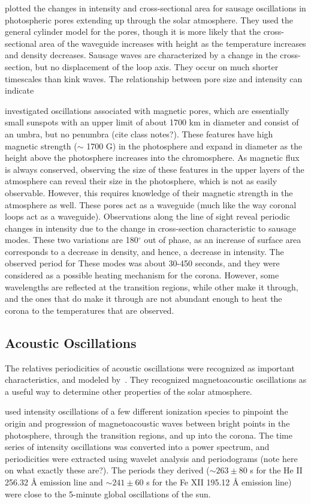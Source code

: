\documentclass[preprint2]{aastex}
\begin{document}
\cite{sausage_1} plotted the changes in intensity and cross-sectional
area for sausage oscillations in photospheric pores extending up
through the solar atmosphere. They used the general cylinder model for
the pores, though it is more likely that the cross-sectional area of
the waveguide increases with height as the temperature increases and
density decreases.
Sausage waves are characterized by a change in the cross-section,
but no displacement of the loop axis. They occur on much shorter
timescales than kink waves.
The relationship between pore size and intensity can
indicate

\cite{sausage_2} investigated oscillations associated with magnetic
pores, which are essentially small sunspots with an upper limit of
about 1700 km in diameter and consist of an umbra, but no penumbra
(cite class notes?). These features have high magnetic strength
($\sim$ 1700 G) in the photosphere and expand in diameter as the
height above the
photosphere increases into the chromosphere. As magnetic flux is
always conserved, observing the size of these features in the upper
layers of the atmosphere can reveal their size in the photosphere,
which is not as easily observable. However, this requires knowledge
of their magnetic strength in the atmosphere as well.
These pores act as a waveguide (much like the way coronal loops act
as a waveguide). Observations along the line of sight reveal periodic
changes in intensity due to the change in cross-section characteristic
to sausage modes. These two variations are 180$^{\circ}$ out of phase,
as an increase of surface area corresponds to a decrease in density,
and hence, a decrease in intensity. The observed period for These modes
was about 30-450 seconds, and they were considered as a
possible heating mechanism for the corona. However, some wavelengths are
reflected at the transition regions, while other make it through,
and the ones that do make it through are not abundant enough to heat
the corona to the temperatures that are observed.

\subsection{Acoustic Oscillations}
The relatives periodicities of acoustic oscillations were recognized
as important characteristics, and modeled by~\cite{acoustic_1}.
They recognized magnetoacoustic oscillations as a useful way to determine
other properties of the solar atmosphere.

\cite{acoustic_2} used intensity oscillations of a few different ionization
species to pinpoint the origin and progression of magnetoacoustic waves
between bright points in the photosphere, through the transition regions,
and up into the corona. The time series of intensity oscillations was
converted into a power spectrum, and periodicities were extracted using
wavelet analysis and periodograms (note here on what exactly these are?).
The periods they derived
($\sim 263 \pm 80$ s for the He II 256.32 \AA{} emission line and
$\sim 241 \pm 60$ s for the Fe XII 195.12 \AA{}  emission line)
were close to the 5-minute global oscillations of the sun.
\end{document}
